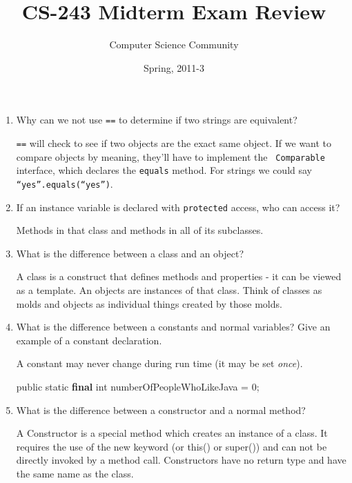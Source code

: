 \documentclass[11pt]{article}
\author{Computer Science Community}
\title{CS-243 Midterm Exam Review}
\date{Spring, 2011-3}
\makeatletter
\newenvironment{answer}{\large\lstset{basicstyle=\large}\color{white}}{}
\newenvironment{answer}{\large\lstset{basicstyle=\large}\color{red}}{}
\let\thetitle\@title
\let\thedate\@date
\makeatother
\begin{document}
\noindent{\Large \thetitle \hfill \thedate}

\begin{enumerate}

\item Why can we not use {\tt ==} to determine if two strings are equivalent?

    \begin{answer}
    {\tt ==} will check to see if two objects are the exact same object. If we
    want to compare objects by meaning, they'll have to implement the {\tt
    Comparable} interface, which declares the {\tt equals} method. For strings
    we could say {\tt ``yes''.equals(``yes'')}.
    \end{answer}

\item If an instance variable is declared with {\tt protected} access, who can
      access it?

    \begin{answer}
    Methods in that class and methods in all of its subclasses.
    \end{answer}

\item What is the difference between a class and an object?

    \begin{answer}
    A class is a construct that defines methods and properties - it can be viewed as a template. An objects are instances of that class. Think of classes as molds and objects as individual things created by those molds.
    \end{answer}

\item What is the difference between a constants and normal variables? Give an
      example of a constant declaration.

    \begin{answer}
    A constant may never change during run time (it may be set {\em once}).

    public static {\bf final} int numberOfPeopleWhoLikeJava = 0;
    \end{answer}

\item What is the difference between a constructor and a normal method?

    \begin{answer}
A Constructor is a special method which creates an instance of a class. It requires the use of the new keyword (or this() or super()) and can not be directly invoked by a method call. Constructors have no return type and have the same name as the class. 
    \end{answer}


\end{enumerate}
\end{document}
